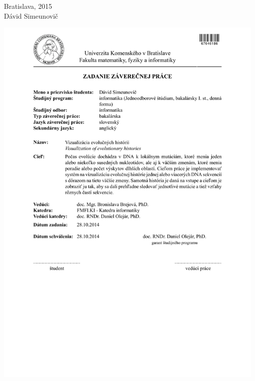 \documentclass[12pt, oneside]{book}
\def\mfyear{2015}
\def\mfauthor{Dávid Simeunovič}
\def\mfplacedate{Bratislava, \mfyear}
\begin{document}
\noindent \mfplacedate\\
\indent\mfauthor

\eject %





\newpage 
\thispagestyle{empty}
\hspace{-1cm}\includegraphics[width=1.2\textwidth]{images/zadanie}


\frontmatter

\newpage 
\thispagestyle{empty}
\end{document}
